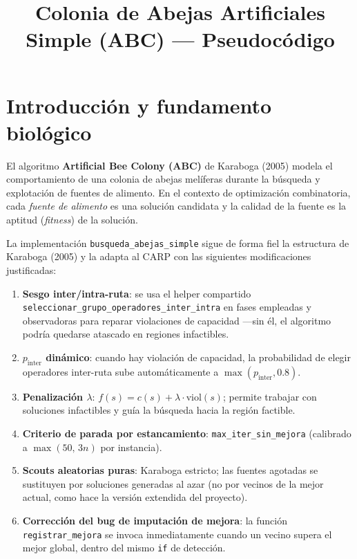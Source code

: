 \documentclass[12pt, a4paper]{article}
\title{Colonia de Abejas Artificiales Simple (ABC) --- Pseudocódigo}
\author{}
\date{}
\begin{document}
\maketitle

\section{Introducción y fundamento biológico}

El algoritmo \textbf{Artificial Bee Colony (ABC)} de Karaboga (2005) modela el
comportamiento de una colonia de abejas melíferas durante la búsqueda y
explotación de fuentes de alimento. En el contexto de optimización combinatoria,
cada \emph{fuente de alimento} es una solución candidata y la calidad de la
fuente es la aptitud (\emph{fitness}) de la solución.

La implementación \texttt{busqueda\_abejas\_simple} sigue de forma fiel la
estructura de Karaboga (2005) y la adapta al CARP con las siguientes
modificaciones justificadas:

\begin{enumerate}
    \item \textbf{Sesgo inter/intra-ruta}: se usa el helper compartido
          \texttt{seleccionar\_grupo\_operadores\_inter\_intra} en fases
          empleadas y observadoras para reparar violaciones de capacidad
          —sin él, el algoritmo podría quedarse atascado en regiones infactibles.
    \item \textbf{$p_{\mathrm{inter}}$ dinámico}: cuando hay violación de
          capacidad, la probabilidad de elegir operadores inter-ruta sube
          automáticamente a $\max(p_{\mathrm{inter}}, 0.8)$.
    \item \textbf{Penalización $\lambda$}: $f(s) = c(s) + \lambda \cdot
          \mathrm{viol}(s)$; permite trabajar con soluciones infactibles y guía
          la búsqueda hacia la región factible.
    \item \textbf{Criterio de parada por estancamiento}: \texttt{max\_iter\_sin\_mejora}
          (calibrado a $\max(50,\,3n)$ por instancia).
    \item \textbf{Scouts aleatorias puras}: Karaboga estricto; las fuentes
          agotadas se sustituyen por soluciones generadas al azar (no por vecinos
          de la mejor actual, como hace la versión extendida del proyecto).
    \item \textbf{Corrección del bug de imputación de mejora}: la función
          \texttt{registrar\_mejora} se invoca inmediatamente cuando un vecino
          supera el mejor global, dentro del mismo \texttt{if} de detección.
\end{enumerate}
\end{document}
